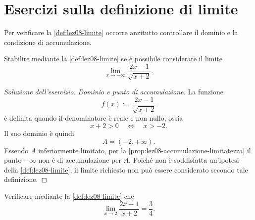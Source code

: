 \section{Esercizi sulla definizione di limite}
\label{sec:lez08-esercizi-limiti}

Per verificare la \cref{def:lez08-limite} occorre
anzitutto controllare il dominio e la condizione
di accumulazione.

\begin{exercise}
\label{ex:lez08-radice-meno-infinito}
Stabilire mediante la \cref{def:lez08-limite} se
è possibile considerare il limite
\[
  \lim_{x\to-\infty}\frac{2x-1}{\sqrt{x+2}}.
\]
\end{exercise}

\begin{proof}[Soluzione dell'esercizio]
\emph{Dominio e punto di accumulazione.}
La funzione
\[
  f(x):=\frac{2x-1}{\sqrt{x+2}}
\]
è definita quando il denominatore è reale e non nullo, ossia
\[
  x+2>0
  \quad\Longleftrightarrow\quad
  x>-2.
\]
Il suo dominio è quindi
\[
  A=(-2,+\infty).
\]
Essendo \(A\) inferiormente limitato, per la
\cref{prop:lez08-accumulazione-limitatezza} il punto
\(-\infty\) non è di accumulazione per \(A\).
Poiché non è soddisfatta un'ipotesi della
\cref{def:lez08-limite}, il limite richiesto
non può essere considerato secondo tale definizione.
\end{proof}

\begin{exercise}
\label{ex:lez08-razionale-finito}
Verificare mediante la \cref{def:lez08-limite} che
\[
  \lim_{x\to2}\frac{2x-1}{x+2}=\frac34.
\]
\end{exercise}


